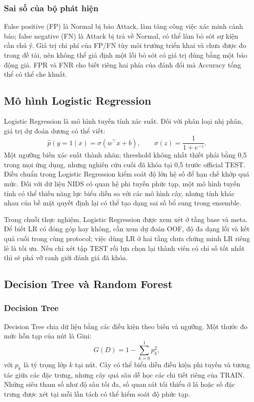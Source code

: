 \subsubsection{Sai số của bộ phát hiện}
False positive (FP) là Normal bị báo Attack, làm tăng công việc xác minh cảnh báo; false negative (FN) là Attack bị trả về Normal, có thể làm bỏ sót sự kiện cần chú ý. Giá trị chi phí của FP/FN tùy môi trường triển khai và chưa được đo trong đề tài, nên không thể giả định một lỗi bỏ sót có giá trị đúng bằng một báo động giả. FPR và FNR cho biết riêng hai phía của đánh đổi mà Accuracy tổng thể có thể che khuất.

\subsection{Mô hình Logistic Regression}
Logistic Regression là mô hình tuyến tính xác suất. Đối với phân loại nhị phân, giá trị dự đoán dương có thể viết:
\begin{equation}
\widehat p(y=1\mid x)=\sigma(w^\top x+b),\qquad \sigma(z)=\frac{1}{1+e^{-z}}.
\label{eq:lr}
\end{equation}
Một ngưỡng biến xác suất thành nhãn; threshold không nhất thiết phải bằng 0,5 trong mọi ứng dụng, nhưng nghiên cứu cuối đã khóa tại 0,5 trước official TEST. Điều chuẩn trong Logistic Regression kiểm soát độ lớn hệ số để hạn chế khớp quá mức. Đối với dữ liệu NIDS có quan hệ phi tuyến phức tạp, một mô hình tuyến tính có thể thiếu năng lực biểu diễn so với các mô hình cây, nhưng tính khác nhau của bề mặt quyết định lại có thể tạo dạng sai số bổ sung trong ensemble.

Trong chuỗi thực nghiệm, Logistic Regression được xem xét ở tầng base và meta. Để biết LR có đóng góp hay không, cần xem dự đoán OOF, độ đa dạng lỗi và kết quả cuối trong cùng protocol; việc dùng LR ở hai tầng chưa chứng minh LR riêng lẻ là tối ưu. Nếu chỉ xét tập TEST rồi lựa chọn lại thành viên có chỉ số tốt nhất thì sẽ phá vỡ ranh giới đánh giá đã khóa.

\subsection{Decision Tree và Random Forest}
\subsubsection{Decision Tree}
Decision Tree chia dữ liệu bằng các điều kiện theo biến và ngưỡng. Một thước đo mức hỗn tạp của nút là Gini:
\begin{equation}
G(D)=1-\sum_{k=0}^{1}p_k^2,
\label{eq:gini}
\end{equation}
với $p_k$ là tỷ trọng lớp $k$ tại nút. Cây có thể biểu diễn điều kiện phi tuyến và tương tác giữa các đặc trưng, nhưng cây quá sâu dễ học các chi tiết riêng của TRAIN. Những siêu tham số như độ sâu tối đa, số quan sát tối thiểu ở lá hoặc số đặc trưng được xét tại mỗi lần tách có thể kiểm soát độ phức tạp.

